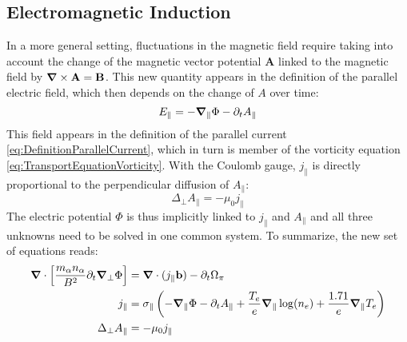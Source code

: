 \subsection{Electromagnetic Induction}
In a more general setting, fluctuations in the magnetic field require taking into account the change of the magnetic vector potential $\mathbf{A}$ linked to the magnetic field by $\grad\times\mathbf{A} = \mathbf{B}$. This new quantity appears in the definition of the parallel electric field, which then depends on the change of $A$ over time:
\begin{equation}
	\label{eq:electricField_eq_gradPhi_p_dtA}
	E_\parallel = -\grad_\parallel\Phi - \partial_t A_\parallel 
\end{equation}
This field appears in the definition of the parallel current \ref{eq:DefinitionParallelCurrent}, which in turn is member of the vorticity equation \ref{eq:TransportEquationVorticity}. With the Coulomb gauge, $j_\parallel$ is directly proportional to the perpendicular diffusion of $A_\parallel$: 
\begin{equation}
	\label{eq:DiffA_eq_mu0jPara}
	\Delta_\perp A_\parallel = -\mu_0j_\parallel
\end{equation}
The electric potential $\Phi$ is thus implicitly linked to $j_\parallel$ and $A_\parallel$ and all three unknowns need to be solved in one common system. To summarize, the new set of equations reads:
\begin{align}
	\grad\cdot\left[\frac{m_\alpha n_\alpha}{ B^2}\partial_t\grad_\perp\Phi\right] &= \grad\cdot(j_\parallel\mathbf{b}) - \partial_t \Omega_\pi \label{eq:NewExtendedSystem_VorticityEquation} \\
	j_\parallel &= \sigma_\parallel\left(-\grad_\parallel\Phi - \partial_tA_\parallel + \frac{ T_e}{e}\grad_\parallel\log(n_e) + \frac{1.71}{e}\grad_\parallel T_e\right) \label{eq:NewExtendedSystem_ParallelCurrent} \\
	\Delta_\perp A_\parallel &= -\mu_0j_\parallel \label{eq:NewExtendedSystem_MagneticPotential}
\end{align}

